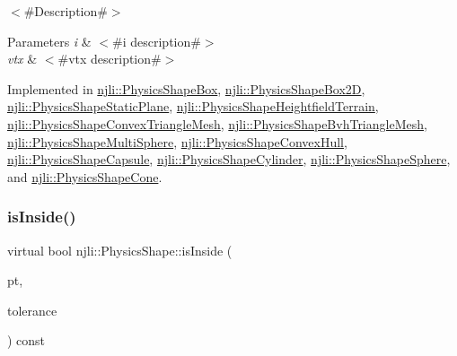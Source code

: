 $<$\#\+Description\#$>$


\begin{DoxyParams}{Parameters}
{\em i} & $<$\#i description\#$>$ \\
\hline
{\em vtx} & $<$\#vtx description\#$>$ \\
\hline
\end{DoxyParams}


Implemented in \mbox{\hyperlink{classnjli_1_1_physics_shape_box_af1045ee343d3434f0187c526bfc23fb5}{njli\+::\+Physics\+Shape\+Box}}, \mbox{\hyperlink{classnjli_1_1_physics_shape_box2_d_ad5d35467acfd3c047d0c85c9aa1ad415}{njli\+::\+Physics\+Shape\+Box2D}}, \mbox{\hyperlink{classnjli_1_1_physics_shape_static_plane_ad6a9435112a9d9ebe56b0db5f8b2f5ce}{njli\+::\+Physics\+Shape\+Static\+Plane}}, \mbox{\hyperlink{classnjli_1_1_physics_shape_heightfield_terrain_aaeba3305211ed8ee895c16cde919d47a}{njli\+::\+Physics\+Shape\+Heightfield\+Terrain}}, \mbox{\hyperlink{classnjli_1_1_physics_shape_convex_triangle_mesh_a53a05210663e07ec01a0882110b9ea56}{njli\+::\+Physics\+Shape\+Convex\+Triangle\+Mesh}}, \mbox{\hyperlink{classnjli_1_1_physics_shape_bvh_triangle_mesh_a3d32ee4da977a41d62c1884eebe8ea93}{njli\+::\+Physics\+Shape\+Bvh\+Triangle\+Mesh}}, \mbox{\hyperlink{classnjli_1_1_physics_shape_multi_sphere_a467600545bb56fe471cb930f5a7b8aad}{njli\+::\+Physics\+Shape\+Multi\+Sphere}}, \mbox{\hyperlink{classnjli_1_1_physics_shape_convex_hull_a274757f4f0bc1cf0e229c95c07fef7bd}{njli\+::\+Physics\+Shape\+Convex\+Hull}}, \mbox{\hyperlink{classnjli_1_1_physics_shape_capsule_afb1902c79121fd1feba6df1b8b70cbd3}{njli\+::\+Physics\+Shape\+Capsule}}, \mbox{\hyperlink{classnjli_1_1_physics_shape_cylinder_a8e138b8eefcf94a6d8a7296ac2c883bf}{njli\+::\+Physics\+Shape\+Cylinder}}, \mbox{\hyperlink{classnjli_1_1_physics_shape_sphere_a6087255ff18c442470b790409261edf9}{njli\+::\+Physics\+Shape\+Sphere}}, and \mbox{\hyperlink{classnjli_1_1_physics_shape_cone_af77e8177d252806cdfaeb05ae88bc305}{njli\+::\+Physics\+Shape\+Cone}}.

\mbox{\label{classnjli_1_1_physics_shape_a346a118ddc9e6b446ae7a8586fee76fa}} 
\subsubsection{\texorpdfstring{is\+Inside()}{isInside()}}
{\footnotesize\ttfamily virtual bool njli\+::\+Physics\+Shape\+::is\+Inside (\begin{DoxyParamCaption}\item[{const bt\+Vector3 \&}]{pt,  }\item[{bt\+Scalar}]{tolerance }\end{DoxyParamCaption}) const\hspace{0.3cm}{\ttfamily [pure virtual]}}

